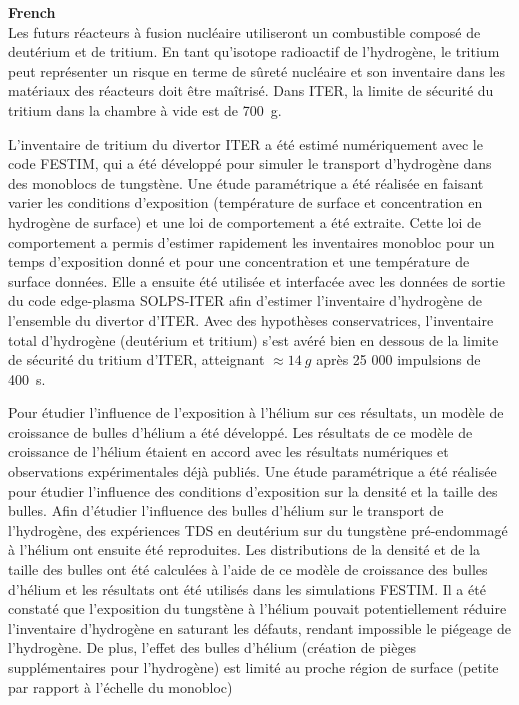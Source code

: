 \textbf{French} \\
Les futurs réacteurs à fusion nucléaire utiliseront un combustible composé de deutérium et de tritium.
En tant qu'isotope radioactif de l'hydrogène, le tritium peut représenter un risque en terme de sûreté nucléaire et son inventaire dans les matériaux des réacteurs doit être maîtrisé.
Dans ITER, la limite de sécurité du tritium dans la chambre à vide est de \SI{700}{g}.

L'inventaire de tritium du divertor ITER a été estimé numériquement avec le code FESTIM, qui a été développé pour simuler le transport d'hydrogène dans des monoblocs de tungstène.
Une étude paramétrique a été réalisée en faisant varier les conditions d'exposition (température de surface et concentration en hydrogène de surface) et une loi de comportement a été extraite.
Cette loi de comportement a permis d'estimer rapidement les inventaires monobloc pour un temps d'exposition donné et pour une concentration et une température de surface données.
Elle a ensuite été utilisée et interfacée avec les données de sortie du code edge-plasma SOLPS-ITER afin d'estimer l'inventaire d'hydrogène de l'ensemble du divertor d'ITER.
Avec des hypothèses conservatrices, l'inventaire total d'hydrogène (deutérium et tritium) s'est avéré bien en dessous de la limite de sécurité du tritium d'ITER, atteignant $\approx \SI{14}{g}$ après 25
000 impulsions de \SI{400}{s}.

Pour étudier l'influence de l'exposition à l'hélium sur ces résultats, un modèle de croissance de bulles d'hélium a été développé.
Les résultats de ce modèle de croissance de l'hélium étaient en accord avec les résultats numériques et observations expérimentales déjà publiés.
Une étude paramétrique a été réalisée pour étudier l'influence des conditions d'exposition sur la densité et la taille des bulles.
Afin d'étudier l'influence des bulles d'hélium sur le transport de l'hydrogène, des expériences TDS en deutérium sur du tungstène pré-endommagé à l'hélium ont ensuite été reproduites.
Les distributions de la densité et de la taille des bulles ont été calculées à l'aide de ce modèle de croissance des bulles d'hélium et les résultats ont été utilisés dans les simulations FESTIM.
Il a été constaté que l'exposition du tungstène à l'hélium pouvait potentiellement réduire l'inventaire d'hydrogène en saturant les défauts, rendant impossible le piégeage de l'hydrogène.
De plus, l'effet des bulles d'hélium (création de pièges supplémentaires pour l'hydrogène) est limité au proche région de surface (petite par rapport à l'échelle du monobloc)
